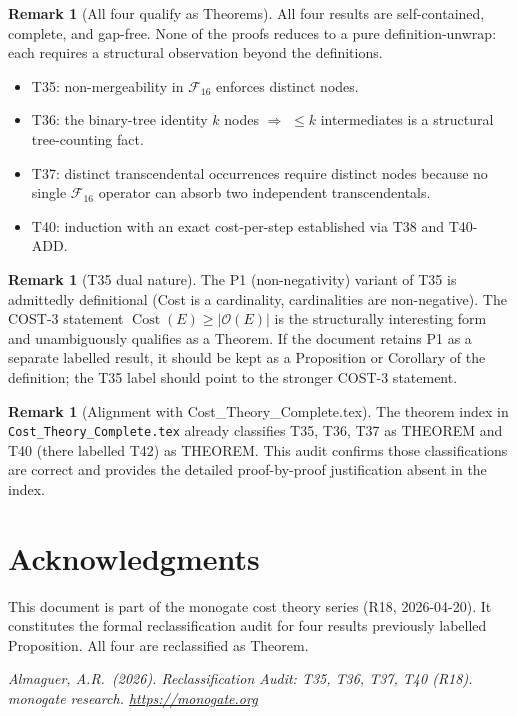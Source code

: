 \documentclass[12pt,a4paper]{article}
\theoremstyle{definition}
\newtheorem{remark}[theorem]{Remark}
\newcommand{\Cost}{\operatorname{Cost}}
\newcommand{\Fam}{\mathcal{F}}
\begin{document}
\begin{remark}[All four qualify as Theorems]
All four results are self-contained, complete, and gap-free.  None of the
proofs reduces to a pure definition-unwrap: each requires a structural
observation beyond the definitions.
\begin{itemize}
  \item T35: non-mergeability in $\Fam_{16}$ enforces distinct nodes.
  \item T36: the binary-tree identity $k$ nodes $\Rightarrow$ $\leq k$
        intermediates is a structural tree-counting fact.
  \item T37: distinct transcendental occurrences require distinct nodes
        because no single $\Fam_{16}$ operator can absorb two independent
        transcendentals.
  \item T40: induction with an exact cost-per-step established via T38
        and T40-ADD.
\end{itemize}
\end{remark}

\begin{remark}[T35 dual nature]
The P1 (non-negativity) variant of T35 is admittedly definitional (Cost is
a cardinality, cardinalities are non-negative).  The COST-3 statement
$\Cost(E) \geq |\mathcal{O}(E)|$ is the structurally interesting form and
unambiguously qualifies as a Theorem.  If the document retains P1 as a
separate labelled result, it should be kept as a Proposition or Corollary
of the definition; the T35 label should point to the stronger COST-3
statement.
\end{remark}

\begin{remark}[Alignment with Cost\_Theory\_Complete.tex]
The theorem index in \texttt{Cost\_Theory\_Complete.tex} already classifies
T35, T36, T37 as THEOREM and T40 (there labelled T42) as THEOREM.  This
audit confirms those classifications are correct and provides the detailed
proof-by-proof justification absent in the index.
\end{remark}

\section*{Acknowledgments}

This document is part of the monogate cost theory series (R18, 2026-04-20).
It constitutes the formal reclassification audit for four results previously
labelled Proposition.  All four are reclassified as Theorem.

\bigskip
\noindent\textit{Almaguer, A.R.\ (2026).
Reclassification Audit: T35, T36, T37, T40 (R18).
monogate research. \url{https://monogate.org}}
\end{document}
